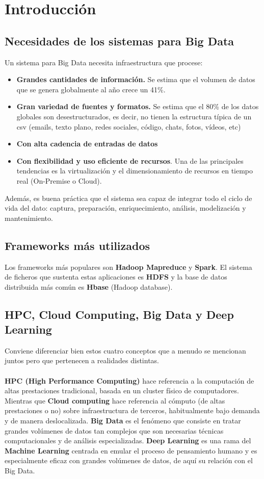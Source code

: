 \section*{Introducción}
\subsection*{Necesidades de los sistemas para Big Data}
Un sistema para Big Data necesita infraestructura que procese:
\begin{itemize}
	\item \textbf{Grandes cantidades de información.} Se estima que el volumen de datos que se genera globalmente al año crece un 41\%. 
	\item \textbf{Gran variedad de fuentes y formatos.} Se estima que el 80\% de los datos globales son desestructurados, es decir, no tienen la estructura típica de un csv (emails, texto plano, redes sociales, código, chats, fotos, vídeos, etc)
	\item \textbf{Con alta cadencia de entradas de datos}
	\item \textbf{Con flexibilidad y uso eficiente de recursos}. Una de las principales tendencias es la virtualización y el dimensionamiento de recursos en tiempo real (On-Premise o Cloud).
\end{itemize}
Además, es buena práctica que el sistema sea capaz de integrar todo el ciclo de vida del dato: captura, preparación, enriquecimiento, análisis, modelización y mantenimiento.
\subsection*{Frameworks más utilizados}
Los frameworks más populares son \textbf{Hadoop Mapreduce} y \textbf{Spark}. El sistema de ficheros que sustenta estas aplicaciones es \textbf{HDFS} y la base de datos distribuida más común es \textbf{Hbase} (Hadoop database).
\subsection*{HPC, Cloud Computing, Big Data y Deep Learning}
Conviene diferenciar bien estos cuatro conceptos que a menudo se mencionan juntos pero que pertenecen a realidades distintas.\\\\
\textbf{HPC (High Performance Computing)} hace referencia a la computación de altas prestaciones tradicional, basada en un cluster físico de computadores. Mientras que \textbf{Cloud computing} hace referencia al cómputo (de altas prestaciones o no) sobre infraestructura de terceros, habitualmente bajo demanda y de manera deslocalizada.
\textbf{Big Data} es el fenómeno que consiste en tratar grandes volúmenes de datos tan complejos que son necesarias técnicas computacionales y de análisis especializadas. \textbf{Deep Learning} es una rama del \textbf{Machine Learning} centrada en emular el proceso de pensamiento humano y es especialmente eficaz con grandes volúmenes de datos, de aquí su relación con el Big Data.
\break
